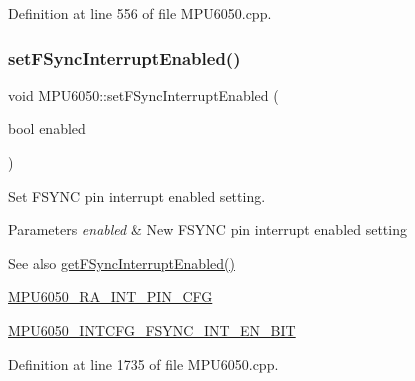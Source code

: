 Definition at line 556 of file M\+P\+U6050.\+cpp.


\begin{DoxyCode}{0}

\end{DoxyCode}
\mbox{\label{classMPU6050_a96aa409e02cdb7d3671890c70b44f167}} 
\subsubsection{\texorpdfstring{setFSyncInterruptEnabled()}{setFSyncInterruptEnabled()}}
{\footnotesize\ttfamily void M\+P\+U6050\+::set\+F\+Sync\+Interrupt\+Enabled (\begin{DoxyParamCaption}\item[{bool}]{enabled }\end{DoxyParamCaption})}

Set F\+S\+Y\+NC pin interrupt enabled setting. 
\begin{DoxyParams}{Parameters}
{\em enabled} & New F\+S\+Y\+NC pin interrupt enabled setting \\
\hline
\end{DoxyParams}
\begin{DoxySeeAlso}{See also}
\mbox{\hyperlink{classMPU6050_a4c01f9ab83b64dbbc6b62e658c3d3d9b}{get\+F\+Sync\+Interrupt\+Enabled()}} 

\mbox{\hyperlink{MPU6050_8h_a82344e1daef2bac2e0d938319528be6c}{M\+P\+U6050\+\_\+\+R\+A\+\_\+\+I\+N\+T\+\_\+\+P\+I\+N\+\_\+\+C\+FG}} 

\mbox{\hyperlink{MPU6050_8h_a39963ea6d8b9cbeebc4daf40f8872fed}{M\+P\+U6050\+\_\+\+I\+N\+T\+C\+F\+G\+\_\+\+F\+S\+Y\+N\+C\+\_\+\+I\+N\+T\+\_\+\+E\+N\+\_\+\+B\+IT}} 
\end{DoxySeeAlso}


Definition at line 1735 of file M\+P\+U6050.\+cpp.


